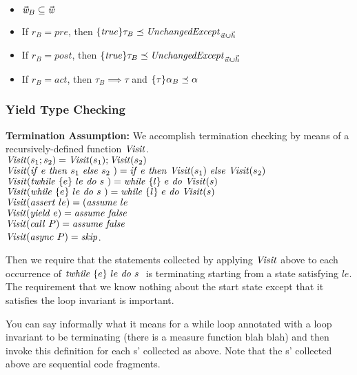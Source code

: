 \begin{itemize}
\item $\vec{\mathit{w}}_{B} \subseteq \vec{\mathit{w}}$
\item If $r_{B} = \mathit{pre}$, then $\{ {\mathit{true}} \} {\tau_{B}} \preceq {\mathit{UnchangedExcept}_{ {\vec{\mathit{w}}\cup \vec{h}} }}$ 
\item If $r_{B} = \mathit{post}$, then $\{ {\mathit{true}} \} {\tau_{B}} \preceq {\mathit{UnchangedExcept}_{ {\vec{\mathit{w}}\cup \vec{h}} }}$ 
\item If $r_{B} = \mathit{act}$, then $\tau_{B} \implies \tau$ and $\{ {\tau} \} {\alpha_{B}} \preceq {\alpha}$
\end{itemize}

\subsubsection{Yield Type Checking}

{\bf Termination Assumption:}
We accomplish termination checking by means of a recursively-defined function ${\mathit{Visit}}$. 
\\

\noindent
${\mathit{Visit}}(s_1; s_2) = {\mathit{Visit}}(s_1); {\mathit{Visit}}(s_2)$\\
${\mathit{Visit}}({\mathit{if}\ {e}\ }{\mathit{then}\ {s_1}\ }{\mathit{else}\ { s_2}\ }) = {\mathit{if}\ {e}\ }{\mathit{then}\ {{\mathit{Visit}}(s_1)}\ }{\mathit{else}\ {{\mathit{Visit}}(s_2)}\ }$\\
${\mathit{Visit}}(\mathit{twhile}\ \{{e}\}\ {{le}\ } \mathit{do}\ {{s}\ }) = \mathit{while}\ \{{l}\}\ {{e}\ } \mathit{do}\ {{{\mathit{Visit}}(s)}\ }$\\
${\mathit{Visit}}(\mathit{while}\ \{{e}\}\ {{le}\ } \mathit{do}\ {{s}\ }) = \mathit{while}\ \{{l}\}\ {{e}\ } \mathit{do}\ {{{\mathit{Visit}}(s)}\ }$\\
${\mathit{Visit}}(\mathit{assert}\ le) = (\mathit{assume}\ le$\\
${\mathit{Visit}}(\mathit{yield}\ e) = \mathit{assume}\ \mathit{false}$\\
${\mathit{Visit}}(\mathit{call}\ P) = \mathit{assume}\ \mathit{false}$\\
${\mathit{Visit}}(\mathit{async}\ P) =\mathit{skip}$.


Then we require that the statements collected by applying ${\mathit{Visit}}$ above to each occurrence of $\mathit{twhile}\ \{{e}\}\ {{le}\ } \mathit{do}\ {{s}\ }$ is terminating starting from a state satisfying $le$.  The requirement that we know nothing about the start state except that it satisfies the loop invariant is important.

You can say informally what it means for a while loop annotated with a loop invariant to be terminating (there is a measure function blah blah) and then invoke this definition for each s' collected as above.  Note that the s' collected above are sequential code fragments.  

